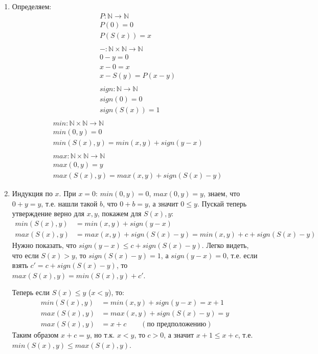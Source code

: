 \begin{solution}
\begin{enumerate}
	\item Определяем:
		\begin{align*}
		    & P : \mathbb{N} \to \mathbb{N} \\
		    & P(0) = 0\\
		    & P(S(x)) = x\\
		    & \\
			& - : \mathbb{N} \times \mathbb{N} \to \mathbb{N}\\
			& 0 - y = 0\\
			& x - 0 = x\\
			& x - S(y) = P(x - y)\\
			& \\
		    & sign : \mathbb{N} \to \mathbb{N} \\
		    & sign(0) = 0\\
		    & sign(S(x)) = 1\\
		\end{align*}
		\begin{align*}
			& min : \mathbb{N} \times \mathbb{N} \to \mathbb{N} \\
			& min(0, y) = 0 \\
			& min(S(x), y) = min(x, y) + sign(y - x)\\
			& \\
			& max : \mathbb{N} \times \mathbb{N} \to \mathbb{N} \\
			& max(0,y) = y \\
			& max(S(x), y) = max(x, y) + sign(S(x) - y)
		\end{align*}
	\item Индукция по $x$. При $x = 0$: $min(0, y) = 0$, $max(0, y) = y$, знаем, что $0 + y = y$, т.е. нашли такой $b$, что $0 + b = y$, а значит $0 \leq y$. Пускай теперь утверждение верно для $x, y$, покажем для $S(x), y$:
	\begin{align*}
		min(S(x), y) &= min(x, y) + sign(y - x)\\
		max(S(x), y) &= max(x, y) + sign(S(x) - y) = min(x, y) + c + sign(S(x) - y)
	\end{align*}
	Нужно показать, что $sign(y - x) \leq c + sign(S(x) - y)$. Легко видеть, что если $S(x) > y$, то $sign(S(x) - y) = 1$, а $sign(y - x) = 0$, т.е. если взять $c' = c + sign(S(x) - y)$, то $max(S(x), y) = min(S(x), y) + c'$. 

	Теперь если $S(x) \leq y$ ($x < y$), то:
	\begin{align*}
		min(S(x), y) &= min(x, y) + sign(y - x) = x + 1\\
		max(S(x), y) &= max(x, y) + sign(S(x) - y) = y\\
		max(S(x), y) &= x + c \qquad (\text{по предположению})
	\end{align*}
	Таким образом $x + c = y$, но т.к. $x < y$, то $c > 0$, а значит $x + 1 \leq x + c$, т.е. $min(S(x), y) \leq max(S(x), y)$. \xqed
\end{enumerate}
\end{solution}


